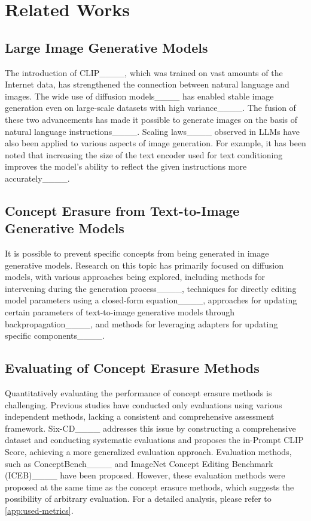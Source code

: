 \section{Related Works}
\subsection{Large Image Generative Models}
The introduction of CLIP____, which was trained on vast amounts of the Internet data, has strengthened the connection between natural language and images. The wide use of diffusion models____ has enabled stable image generation even on large-scale datasets with high variance____. The fusion of these two advancements has made it possible to generate images on the basis of natural language instructions____. Scaling laws____ observed in LLMs have also been applied to various aspects of image generation. For example, it has been noted that increasing the size of the text encoder used for text conditioning improves the model's ability to reflect the given instructions more accurately____.

\subsection{Concept Erasure from Text-to-Image Generative Models}
It is possible to prevent specific concepts from being generated in image generative models. Research on this topic has primarily focused on diffusion models, with various approaches being explored, including methods for intervening during the generation process____, techniques for directly editing model parameters using a closed-form equation____, approaches for updating certain parameters of text-to-image generative models through backpropagation____, and methods for leveraging adapters for updating specific components____.

\subsection{Evaluating of Concept Erasure Methods}
Quantitatively evaluating the performance of concept erasure methods is challenging. Previous studies have conducted only evaluations using various independent methods, lacking a consistent and comprehensive assessment framework. Six-CD____ addresses this issue by constructing a comprehensive dataset and conducting systematic evaluations and proposes the in-Prompt CLIP Score, achieving a more generalized evaluation approach. 
Evaluation methods, such as ConceptBench____ and ImageNet Concept Editing Benchmark (ICEB)____ have been proposed. However, these evaluation methods were proposed at the same time as the concept erasure methods, which suggests the possibility of arbitrary evaluation. For a detailed analysis, please refer to \cref{app:used-metrics}.